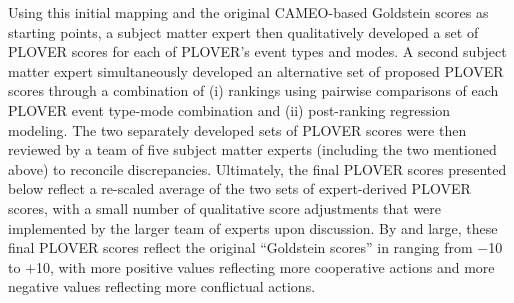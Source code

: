 \documentclass[11pt]{report}
\begin{document}
Using this initial mapping and the original CAMEO-based Goldstein scores as  starting points, a subject matter expert then qualitatively developed a set of PLOVER scores for each of PLOVER's event types and modes. A second subject matter expert simultaneously developed an alternative set of proposed PLOVER scores through a combination of (i) rankings using pairwise comparisons of each PLOVER event type-mode combination and (ii) post-ranking regression modeling. The two separately developed sets of PLOVER scores were then reviewed by a team of five subject matter experts (including the two mentioned above) to reconcile discrepancies. Ultimately, the final PLOVER scores presented below reflect a re-scaled average of the two sets of expert-derived PLOVER scores, with a small number of qualitative score adjustments that were implemented by the larger team of experts upon discussion. By and large, these final PLOVER scores reflect the original ``Goldstein scores'' in ranging from $-$10 to $+$10, with more positive values reflecting more cooperative actions and more negative values reflecting more conflictual actions.


\end{document}

